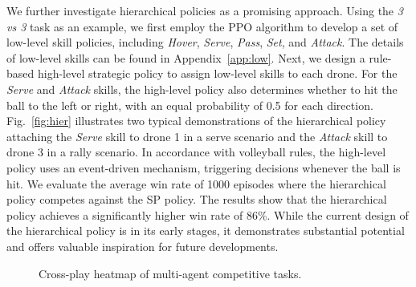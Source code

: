 We further investigate hierarchical policies as a promising approach. Using the \textit{3 vs 3} task as an example, we first employ the PPO algorithm to develop a set of low-level skill policies, including \textit{Hover}, \textit{Serve}, \textit{Pass}, \textit{Set}, and \textit{Attack}. The details of low-level skills can be found in Appendix~\ref{app:low}. Next, we design a rule-based high-level strategic policy to assign low-level skills to each drone. For the \textit{Serve} and \textit{Attack} skills, the high-level policy also determines whether to hit the ball to the left or right, with an equal probability of 0.5 for each direction. Fig.~\ref{fig:hier} illustrates two typical demonstrations of the hierarchical policy attaching the \textit{Serve} skill to drone 1 in a serve scenario and the \textit{Attack} skill to drone 3 in a rally scenario.
In accordance with volleyball rules, the high-level policy uses an event-driven mechanism, triggering decisions whenever the ball is hit. 
We evaluate the average win rate of 1000 episodes where the hierarchical policy competes against the SP policy. The results show that the hierarchical policy achieves a significantly higher win rate of 86\%. While the current design of the hierarchical policy is in its early stages, it demonstrates substantial potential and offers valuable inspiration for future developments.

\begin{figure}[t]
    \centering
    \hfill
    \vspace{-2mm}
    \caption{Cross-play heatmap of multi-agent competitive tasks.}
    \label{fig:crossplay}
    \vspace{-2mm}
\end{figure}

